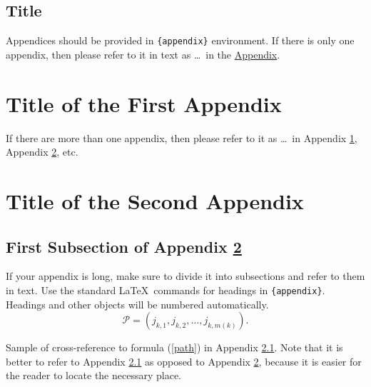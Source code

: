 \documentclass[rbe,wwwview]{econbr}
\begin{document}
\begin{appendix}
\section*{Title}\label{appn} %
Appendices should be provided in \verb|{appendix}| environment. If there is only one appendix, then please refer to it in text as \ldots\ in the \hyperref[appn]{Appendix}.
\end{appendix}

\begin{appendix}
\section{Title of the First Appendix}\label{appA}
If there are more than one appendix, then please refer to it as \ldots\ in Appendix \ref{appA}, Appendix \ref{appB}, etc.

\section{Title of the Second Appendix}\label{appB}
\subsection{First Subsection of Appendix \protect\ref{appB}}\label{appB1}

If your appendix is long, make sure to divide it into subsections and refer to them in text. Use the standard \LaTeX\ commands for headings in \verb|{appendix}|. Headings and other objects will be numbered automatically.
\begin{equation}
\mathcal{P}=(j_{k,1},j_{k,2},\dots,j_{k,m(k)}). \label{path}
\end{equation}

Sample of cross-reference to formula (\ref{path}) in Appendix \ref{appB1}. Note that it is better to refer to Appendix \ref{appB1} as opposed to Appendix \ref{appB}, because it is easier for the reader to locate the necessary place.
\end{appendix}

\end{document}
